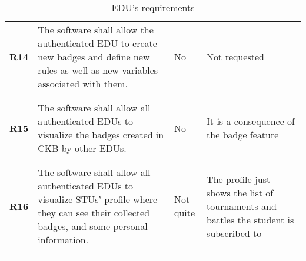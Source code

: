 \begin{longtable}[H]{l p{8cm} l p{2cm}}
    \textbf{R14} & The software shall allow the authenticated EDU to create new badges and define new rules as well as new variables associated with them.                                                                                                                                  & No                   & Not requested                                                                           \\
                 &                                                                                                                                                                                                                                                                          &                      &                                                                                         \\\hline & & & \\
    \textbf{R15} & The software shall allow all authenticated EDUs to visualize the badges created in CKB by other EDUs.                                                                                                                                                                    & No                   & It is a consequence of the badge feature                                                \\
                 &                                                                                                                                                                                                                                                                          &                      &                                                                                         \\\hline & & & \\
    \textbf{R16} & The software shall allow all authenticated EDUs to visualize STUs' profile where they can see their collected badges, and some personal information.                                                                                                                     & Not quite            & The profile just shows the list of tournaments and battles the student is subscribed to \\
                 &                                                                                                                                                                                                                                                                          &                      &                                                                                         \\
    \hline
    \caption{EDU's requirements}
\end{longtable}

